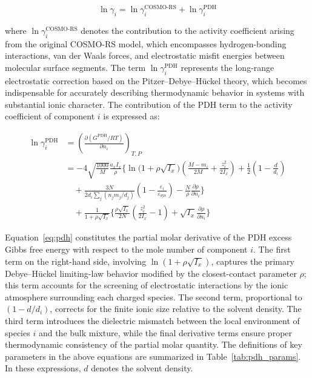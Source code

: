 \documentclass[AMA,LATO2COL]{WileyNJDv5} %
\begin{document}
\[
\ln \gamma_i = \ln \gamma_i^\text{COSMO-RS} + \ln \gamma_i^\text{PDH}
\]

where \(\ln \gamma_i^\text{COSMO-RS}\) denotes the contribution to the activity coefficient arising from the original COSMO-RS model, which encompasses hydrogen-bonding interactions, van der Waals forces, and electrostatic misfit energies between molecular surface segments. The term \(\ln \gamma_i^\text{PDH}\) represents the long-range electrostatic correction based on the Pitzer--Debye--H\"{u}ckel theory, which becomes indispensable for accurately describing thermodynamic behavior in systems with substantial ionic character. The contribution of the PDH term to the activity coefficient of component \(i\) is expressed as:

\begin{equation}
\label{eq:pdh}
\begin{aligned}
\ln \gamma_i^\text{PDH}
&= \left( \frac{\partial (G^\text{PDH}/RT)}{\partial n_i} \right)_{T,P} \\
&= -4 \sqrt{\frac{1000}{M}} \frac{a_x I_x}{\rho} \bigg\{
\ln\!\big(1+\rho\sqrt{I_x}\big)
\left( \frac{M - m_i}{2M} + \frac{z_i^2}{2I_x} \right)
+ \frac{1}{2}\!\left(1 - \frac{d}{d_i}\right) \\
&\quad + \frac{3N}{2d_i \sum_j (n_j m_j/d_j)}
\!\left(1 - \frac{\varepsilon_i}{\varepsilon_\text{sys}}\right)
- \frac{N}{\rho} \frac{\partial \rho}{\partial n_i}
\bigg\} \\
&\quad + \frac{1}{1+\rho\sqrt{I_x}}
\bigg\{
\frac{\rho\sqrt{I_x}}{2N}\left( \frac{z_i^2}{2I_x} - 1 \right)
+ \sqrt{I_x} \frac{\partial \rho}{\partial n_i}
\bigg\}
\end{aligned}
\end{equation}

Equation~\eqref{eq:pdh} constitutes the partial molar derivative of the PDH excess Gibbs free energy with respect to the mole number of component $i$. The first term on the right-hand side, involving $\ln(1+\rho\sqrt{I_x})$, captures the primary Debye--H\"{u}ckel limiting-law behavior modified by the closest-contact parameter $\rho$; this term accounts for the screening of electrostatic interactions by the ionic atmosphere surrounding each charged species. The second term, proportional to $(1 - d/d_i)$, corrects for the finite ionic size relative to the solvent density. The third term introduces the dielectric mismatch between the local environment of species $i$ and the bulk mixture, while the final derivative terms ensure proper thermodynamic consistency of the partial molar quantity. The definitions of key parameters in the above equations are summarized in Table~\ref{tab:pdh_params}. In these expressions, $d$ denotes the solvent density.
\end{document}
